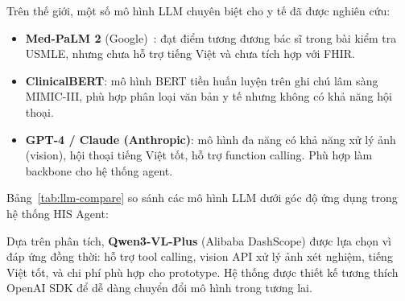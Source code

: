\documentclass[a4paper,13pt,3p,twoside,openany]{report}
\theoremstyle{definition}
\theoremstyle{remark}
\theoremstyle{definition}
\begin{document}
Trên thế giới, một số mô hình LLM chuyên biệt cho y tế đã được nghiên cứu:

\begin{itemize}
  \item \textbf{Med-PaLM 2} (Google)~\cite{medpalm}: đạt điểm tương đương bác sĩ trong bài kiểm tra USMLE, nhưng chưa hỗ trợ tiếng Việt và chưa tích hợp với FHIR.
  \item \textbf{ClinicalBERT}: mô hình BERT tiền huấn luyện trên ghi chú lâm sàng MIMIC-III, phù hợp phân loại văn bản y tế nhưng không có khả năng hội thoại.
  \item \textbf{GPT-4 / Claude (Anthropic)}: mô hình đa năng có khả năng xử lý ảnh (vision), hội thoại tiếng Việt tốt, hỗ trợ function calling. Phù hợp làm backbone cho hệ thống agent.
\end{itemize}

Bảng~\ref{tab:llm-compare} so sánh các mô hình LLM dưới góc độ ứng dụng trong hệ thống HIS Agent:

\begin{table}[H]
\centering
{}
\caption{So sánh các mô hình LLM theo tiêu chí ứng dụng y tế}
\label{tab:llm-compare}
\end{table}

Dựa trên phân tích, \textbf{Qwen3-VL-Plus} (Alibaba DashScope) được lựa chọn vì đáp ứng đồng thời: hỗ trợ tool calling, vision API xử lý ảnh xét nghiệm, tiếng Việt tốt, và chi phí phù hợp cho prototype. Hệ thống được thiết kế tương thích OpenAI SDK để dễ dàng chuyển đổi mô hình trong tương lai.
\end{document}
